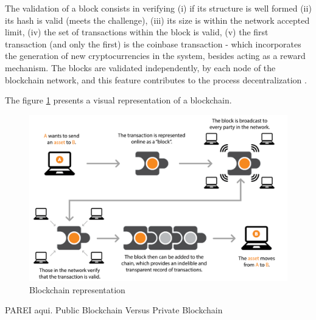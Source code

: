 The validation of a block consists in verifying (i) if its structure is well formed (ii) its hash is valid (meets the challenge), (iii) its size is within the network accepted limit, (iv) the set of transactions within the block is valid, (v) the first transaction (and only the first) is the coinbase transaction - which incorporates the generation of new cryptocurrencies in the system, besides acting as a reward mechanism. The blocks are validated independently, by each node of the blockchain network, and this feature contributes to the process decentralization \cite{greve2018blockchain}.

The figure \ref{fig:blockchain} presents a visual representation of a blockchain.

\begin{figure}[htbp]
\begin{center}
  \includegraphics[scale=0.35]{images/blockchain.png}
\caption{Blockchain representation \cite{michael2018blockchain}}
\label{fig:blockchain}
\end{center}
\end{figure}

{\color{red} PAREI aqui. Public Blockchain Versus Private Blockchain}